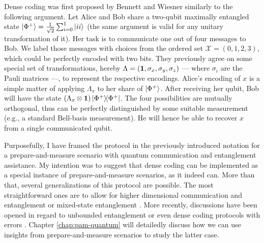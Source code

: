             Dense coding was first proposed by Bennett and Wiesner \cite{bennett_1992_superdense} similarly to the following argument. Let Alice and Bob share a two-qubit maximally entangled state $\ket{\Phi^+} = \frac{1}{\sqrt{2}} \sum_{i = 0}^{1} \ket{ii}$ (the same argument is valid for any unitary transformation of it). Her task is to communicate one out of four messages to Bob. We label those messages with choices from the ordered set $\mathcal{X} = (0, 1, 2, 3)$, which could be perfectly encoded with two bits. They previously agree on some special set of transformations, hereby $\Lambda = (\mathbf{1},\sigma_x, \sigma_y, \sigma_z)$ --- where $\sigma_i$ are the Pauli matrices ---, to represent the respective encodings. Alice's encoding of $x$ is a simple matter of applying $\Lambda_x$ to her share of $\ket{\Phi^+}$. After receiving her qubit, Bob will have the state $\left( \Lambda_x \otimes \mathbf{1} \right) \ketbra{\Phi^+}{\Phi^+}$. The four possibilities are mutually orthogonal, thus can be perfectly distinguished by some suitable measurement (e.g., a standard Bell-basis measurement). He will hence be able to recover $x$ from a single communicated qubit.
            
            Purposefully, I have framed the protocol in the previously introduced notation for a prepare-and-measure scenario with quantum communication and entanglement assistance. My intention was to suggest that dense coding can be implemented as a special instance of prepare-and-measure scenarios, as it indeed can. More than that, several generalizations of this protocol are possible. The most straightforward ones are to allow for higher dimensional communication and entanglement \cite{bennett_1992_superdense} or mixed-state entanglement \cite{barenco_dense_1995}. More recently, discussions have been opened in regard to unbounded entanglement \cite{tavakoli_eapam_2021} or even dense coding protocols with errors \cite{nayak_rigidity_2020,moreno_pamdense_2021}. Chapter \ref{chap:pam-quantum} will detailedly discuss how we can use insights from prepare-and-measure scenarios to study the latter case. 